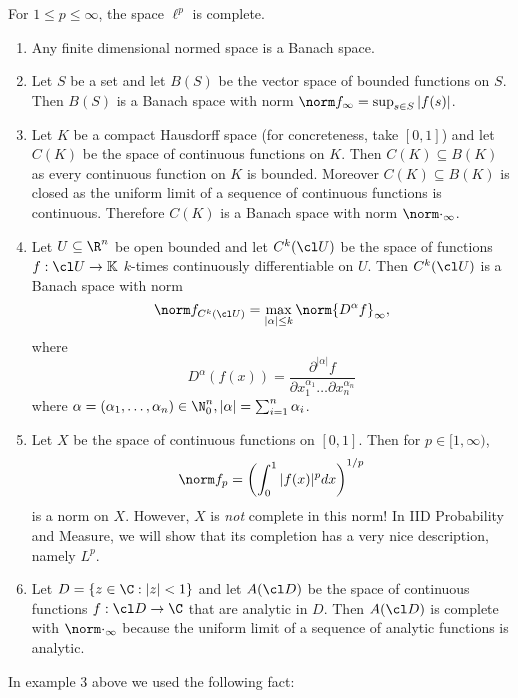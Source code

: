 \documentclass[a4paper]{article}
\newcommand{\K}{{\mathbb{K}}} %
\begin{document}
\begin{ex}
  For \(1 \leq p \leq \infty\), the space \(\ell^p\) is complete.
\end{ex}

\begin{eg}\leavevmode
  \begin{enumerate}
  \item Any finite dimensional normed space is a Banach space.
  \item Let \(S\) be a set and let \(B(S)\) be the vector space of bounded functions on \(S\). Then \(B(S)\) is a Banach space with norm \(\norm f_\infty = \sup_{s \in S} |f(s)|\).
  \item Let \(K\) be a compact Hausdorff space (for concreteness, take \([0, 1]\)) and let \(C(K)\) be the space of continuous functions on \(K\). Then \(C(K) \subseteq B(K)\) as every continuous function on \(K\) is bounded. Moreover \(C(K) \subseteq B(K)\) is closed as the uniform limit of a sequence of continuous functions is continuous. Therefore \(C(K)\) is a Banach space with norm \(\norm \cdot_\infty\).
  \item Let \(U \subseteq \R^n\) be open bounded and let \(C^k(\cl U)\) be the space of functions \(f: \cl U \to \K\) \(k\)-times continuously differentiable on \(U\). Then \(C^k(\cl U)\) is a Banach space with norm
    \[
      \norm f_{C^k(\cl U)} = \max_{|\alpha| \leq k} \norm{D^\alpha f}_\infty,
    \]
    where
    \[
      D^\alpha(f(x)) = \frac{\partial^{|\alpha|} f}{\partial x_1^{\alpha_1} \dots \partial x_n^{\alpha_n}}
    \]
    where \(\alpha = (\alpha_1, \dots, \alpha_n) \in \N_0^n, |\alpha| = \sum_{i = 1}^n \alpha_i\).
  \item Let \(X\) be the space of continuous functions on \([0, 1]\). Then for \(p \in [1, \infty)\),
    \[
      \norm f_p = \left( \int_0^1 |f(x)|^p dx \right)^{1/p}
    \]
    is a norm on \(X\). However, \(X\) is \emph{not} complete in this norm! In IID Probability and Measure, we will show that its completion has a very nice description, namely \(L^p\).
  \item Let \(D = \{z \in \C: |z| < 1\}\) and let \(A(\cl D)\) be the space of continuous functions \(f: \cl D \to \C\) that are analytic in \(D\). Then \(A(\cl D)\) is complete with \(\norm \cdot_\infty\) because the uniform limit of a sequence of analytic functions is analytic.
  \end{enumerate}
\end{eg}

In example 3 above we used the following fact:
\end{document}
